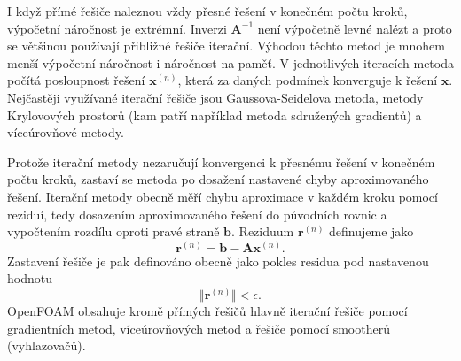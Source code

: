 \documentclass[a4paper,12pt]{report}
\theoremstyle{remark}
\begin{document}
	I když přímé řešiče naleznou vždy přesné řešení v konečném počtu kroků, výpočetní náročnost je extrémní. Inverzi $\boldsymbol{A} ^{-1}$ není výpočetně levné nalézt a proto se většinou používají přibližné řešiče iterační. Výhodou těchto metod je mnohem menší výpočetní náročnost i náročnost na paměť. V jednotlivých iteracích metoda počítá posloupnost řešení $\boldsymbol{x}^{(n)}$, která za daných podmínek konverguje k řešení $\boldsymbol{x}$.  Nejčastěji využívané iterační řešiče jsou Gaussova-Seidelova metoda, metody Krylovových prostorů (kam patří například metoda sdružených gradientů) a víceúrovňové metody.
	
	Protože iterační metody nezaručují konvergenci k přesnému řešení v konečném počtu kroků, zastaví se metoda po dosažení nastavené chyby aproximovaného řešení. Iterační metody obecně měří chybu aproximace v každém kroku pomocí reziduí, tedy dosazením aproximovaného řešení do původních rovnic a vypočtením rozdílu oproti pravé straně $\boldsymbol{b}$. Reziduum $\boldsymbol{r} ^{(n)} $ definujeme jako 
	\begin{equation}
		\boldsymbol{r} ^{(n)} = \boldsymbol{b}-\boldsymbol{A} \boldsymbol{x}^{(n)}.
		\label{eq:residuum}
	\end{equation} 
Zastavení řešiče je pak definováno obecně jako pokles residua pod nastavenou hodnotu
\begin{equation}
	\Vert{\boldsymbol{r}^{(n)}}\Vert < \epsilon.
\end{equation}
	OpenFOAM obsahuje kromě přímých řešičů hlavně iterační řešiče pomocí gradientních metod, víceúrovňových metod a řešiče pomocí smootherů (vyhlazovačů).
	
\end{document}
